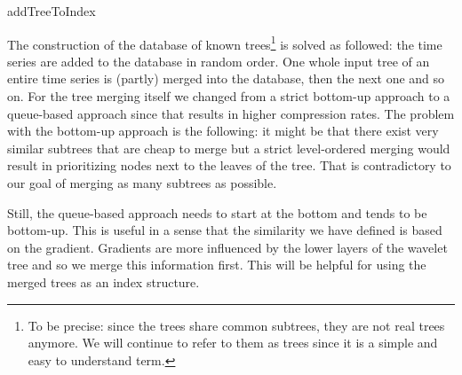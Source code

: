 \begin{algorithm}



    \caption{addTreeToIndex}\label{algo:addTreeToIndex}
\end{algorithm}

The construction of the database of known trees\footnote{To be precise: since the trees share common subtrees, they are not real trees anymore. We will continue to refer to them as trees since it is a simple and easy to understand term.} is solved as followed: the time series are added to the database in random order. One whole input tree of an entire time series is (partly) merged into the database, then the next one and so on. For the tree merging itself we changed from a strict bottom-up approach to a queue-based approach since that results in higher compression rates. The problem with the bottom-up approach is the following: it might be that there exist very similar subtrees that are cheap to merge but a strict level-ordered merging would result in prioritizing nodes next to the leaves of the tree. That is contradictory to our goal of merging as many subtrees as possible.

Still, the queue-based approach needs to start at the bottom and tends to be bottom-up. This is useful in a sense that the similarity we have defined is based on the gradient. Gradients are more influenced by the lower layers of the wavelet tree and so we merge this information first. This will be helpful for using the merged trees as an index structure.

